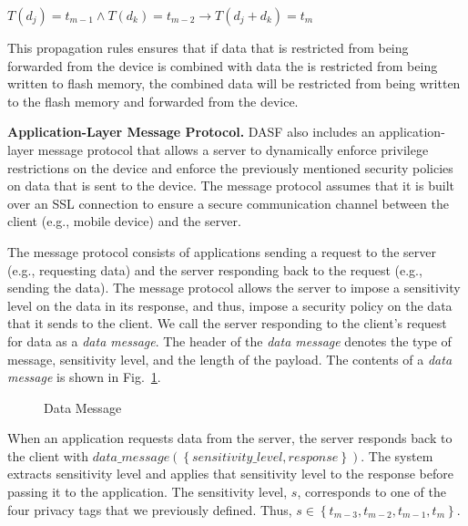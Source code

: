 $T\left(d_{j}\right) = t_{m-1} \wedge T\left(d_{k}\right) = t_{m-2} \to T\left(d_{j}+d_{k}\right) = t_{m}$

This propagation rules ensures that if data that is restricted from
being forwarded from the device is combined with data the is restricted
from being written to flash memory, the combined data will be restricted
from being written to the flash memory and forwarded from the device.

\textbf{Application-Layer Message Protocol.}   DASF
also includes an application-layer message protocol
that allows a server to dynamically enforce privilege restrictions
on the device and enforce the previously mentioned security policies
on data that is sent to the device.  The message
protocol assumes that it is built over an SSL connection to ensure
a secure communication channel between the client (e.g., mobile
device) and the server.

The message protocol consists of applications sending a request to
the server (e.g., requesting data) and the server responding back
to the request (e.g., sending the data).  The message protocol
allows the server to impose a sensitivity level on the data in
its response, and thus, impose a security policy on the data that
it sends to the client.  We call the server responding to the
client's request for data as a \textit{data message}.
The header of the \textit{data message} denotes the type of message,
sensitivity level, and the length of the payload.  The contents of a
\textit{data message} is shown in Fig.~\ref{fig:datamessage}.

\begin{figure}[ht]
\centering
{}
\caption{Data Message}
\label{fig:datamessage}
\end{figure}

\vspace{-3mm}

When an application requests data from the server, the server
responds back to the client with
$data\_message\left(\left\{sensitivity\_level, response\right\}\right)$.
The system extracts sensitivity level and applies that sensitivity level
to the response before passing it to the application.  The sensitivity
level, $s$, corresponds to one of the four privacy tags that we previously defined.
Thus,  $s \in \left\{t_{m-3}, t_{m-2}, t_{m-1}, t_{m}\right\}$.

